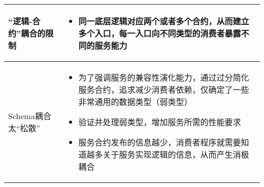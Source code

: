 \begin{longtable}{|m{3cm}<{\centering}|m{12cm}|}
    \hline
    “逻辑-合约”耦合的限制
    & 
    \vspace{-1.3em}
    \begin{itemize}[leftmargin=1.5em,itemsep=-3pt,topsep=-3pt]
        \item 同一底层逻辑对应两个或者多个合约，从而建立多个入口，每一入口向不同类型的消费者暴露不同的服务能力
    \vspace{-1.5em}
    \end{itemize}  
    \\ \hline
    Schema耦合太“松散”
    & 
    \vspace{-1.3em}
    \begin{itemize}[leftmargin=1.5em,itemsep=-3pt,topsep=-3pt]
        \item 为了强调服务的兼容性演化能力，通过过分简化服务合约，追求减少消费者依赖，仅确定了一些非常通用的数据类型（弱类型）
        \item 验证并处理弱类型，增加服务所需的性能要求
        \item 服务合约发布的信息越少，消费者程序就需要知道越多关于服务实现逻辑的信息，从而产生消极耦合  
    \vspace{-1.5em}
    \end{itemize}  
    \\ \hline
\end{longtable}